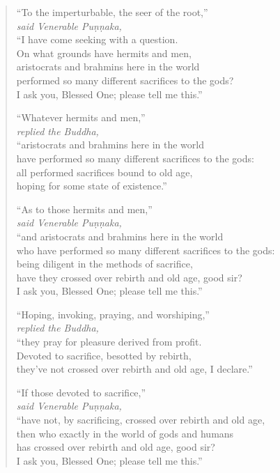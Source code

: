 \documentclass[12pt,openany]{book}%
\newcommand*{\scspeaker}[1]{\hspace{2em}\textit{#1}}
\begin{document}
\begin{verse}%
“To the imperturbable, the seer of the root,” \\
\scspeaker{said Venerable \textsanskrit{Puṇṇaka}, }\\
“I have come seeking with a question. \\
On what grounds have hermits and men, \\
aristocrats and brahmins here in the world \\
performed so many different sacrifices to the gods? \\
I ask you, Blessed One; please tell me this.” 

“Whatever hermits and men,” \\
\scspeaker{replied the Buddha, }\\
“aristocrats and brahmins here in the world \\
have performed so many different sacrifices to the gods: \\
all performed sacrifices bound to old age, \\
hoping for some state of existence.” 

“As to those hermits and men,” \\
\scspeaker{said Venerable \textsanskrit{Puṇṇaka}, }\\
“and aristocrats and brahmins here in the world \\
who have performed so many different sacrifices to the gods: \\
being diligent in the methods of sacrifice, \\
have they crossed over rebirth and old age, good sir? \\
I ask you, Blessed One; please tell me this.” 

“Hoping, invoking, praying, and worshiping,” \\
\scspeaker{replied the Buddha, }\\
“they pray for pleasure derived from profit. \\
Devoted to sacrifice, besotted by rebirth, \\
they’ve not crossed over rebirth and old age, I declare.” 

“If those devoted to sacrifice,” \\
\scspeaker{said Venerable \textsanskrit{Puṇṇaka}, }\\
“have not, by sacrificing, crossed over rebirth and old age, \\
then who exactly in the world of gods and humans \\
has crossed over rebirth and old age, good sir? \\
I ask you, Blessed One; please tell me this.” 


\end{verse}
\end{document}
